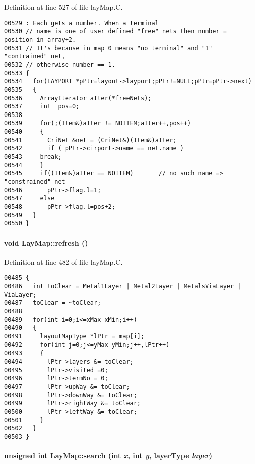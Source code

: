 Definition at line 527 of file lay\-Map.C.\small\begin{verbatim}00529 : Each gets a number. When a terminal
00530 // name is one of user defined "free" nets then number = position in array+2.
00531 // It's because in map 0 means "no terminal" and "1"  "contrained" net, 
00532 // otherwise number == 1.
00533 {
00534   for(LAYPORT *pPtr=layout->layport;pPtr!=NULL;pPtr=pPtr->next)
00535   {
00536     ArrayIterator aIter(*freeNets);
00537     int  pos=0;
00538     
00539     for(;(Item&)aIter != NOITEM;aIter++,pos++)
00540     {
00541       CriNet &net = (CriNet&)(Item&)aIter;
00542       if ( pPtr->cirport->name == net.name )
00543     break;
00544     }
00545     if((Item&)aIter == NOITEM)       // no such name => "constrained" net
00546       pPtr->flag.l=1;
00547     else
00548       pPtr->flag.l=pos+2;      
00549   }
00550 }
\end{verbatim}\normalsize 
\label{LayMap_c4}
\paragraph{\setlength{\rightskip}{0pt plus 5cm}void Lay\-Map::refresh ()\hspace{0.3cm}{\tt  [private]}}\hfill



Definition at line 482 of file lay\-Map.C.\small\begin{verbatim}00485 {
00486   int toClear = Metal1Layer | Metal2Layer | MetalsViaLayer | ViaLayer;
00487   toClear = ~toClear;
00488 
00489   for(int i=0;i<=xMax-xMin;i++)
00490   {
00491     layoutMapType *lPtr = map[i];
00492     for(int j=0;j<=yMax-yMin;j++,lPtr++)
00493     {
00494       lPtr->layers &= toClear;
00495       lPtr->visited =0;
00496       lPtr->termNo = 0;
00497       lPtr->upWay &= toClear;
00498       lPtr->downWay &= toClear;
00499       lPtr->rightWay &= toClear;
00500       lPtr->leftWay &= toClear;
00501     }
00502   }
00503 }
\end{verbatim}\normalsize 
\label{LayMap_c0}
\paragraph{\setlength{\rightskip}{0pt plus 5cm}unsigned int Lay\-Map::search (int {\em x}, int {\em y}, {\bf layer\-Type} {\em layer})\hspace{0.3cm}{\tt  [private]}}\hfill



